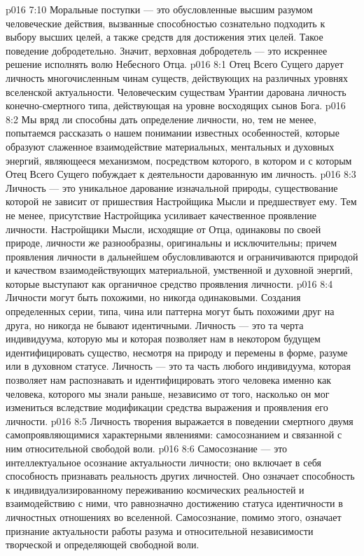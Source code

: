 \vs p016 7:10 Моральные поступки --- это обусловленные высшим разумом человеческие действия, вызванные способностью сознательно подходить к выбору высших целей, а также средств для достижения этих целей. Такое поведение добродетельно. Значит, верховная добродетель --- это искреннее решение исполнять волю Небесного Отца.
\vs p016 8:1 Отец Всего Сущего дарует личность многочисленным чинам существ, действующих на различных уровнях вселенской актуальности. Человеческим существам Урантии дарована личность конечно\hyp{}смертного типа, действующая на уровне восходящих сынов Бога.
\vs p016 8:2 Мы вряд ли способны дать определение личности, но, тем не менее, попытаемся рассказать о нашем понимании известных особенностей, которые образуют слаженное взаимодействие материальных, ментальных и духовных энергий, являющееся механизмом, посредством которого, в котором и с которым Отец Всего Сущего побуждает к деятельности дарованную им личность.
\vs p016 8:3 Личность --- это уникальное дарование изначальной природы, существование которой не зависит от пришествия Настройщика Мысли и предшествует ему. Тем не менее, присутствие Настройщика усиливает качественное проявление личности. Настройщики Мысли, исходящие от Отца, одинаковы по своей природе, личности же разнообразны, оригинальны и исключительны; причем проявления личности в дальнейшем обусловливаются и ограничиваются природой и качеством взаимодействующих материальной, умственной и духовной энергий, которые выступают как органичное средство проявления личности.
\vs p016 8:4 Личности могут быть похожими, но никогда одинаковыми. Создания определенных серии, типа, чина или паттерна могут быть похожими друг на друга, но никогда не бывают идентичными. Личность --- это та черта индивидуума, которую мы  и которая позволяет нам в некотором будущем идентифицировать существо, несмотря на природу и перемены в форме, разуме или в духовном статусе. Личность --- это та часть любого индивидуума, которая позволяет нам распознавать и идентифицировать этого человека именно как человека, которого мы знали раньше, независимо от того, насколько он мог измениться вследствие модификации средства выражения и проявления его личности.
\vs p016 8:5 \pc Личность творения выражается в поведении смертного двумя самопроявляющимися характерными явлениями: самосознанием и связанной с ним относительной свободой воли.
\vs p016 8:6 Самосознание --- это интеллектуальное осознание актуальности личности; оно включает в себя способность признавать реальность других личностей. Оно означает способность к индивидуализированному переживанию космических реальностей и взаимодействию с ними, что равнозначно достижению статуса идентичности в личностных отношениях во вселенной. Самосознание, помимо этого, означает признание актуальности работы разума и относительной независимости творческой и определяющей свободной воли.
